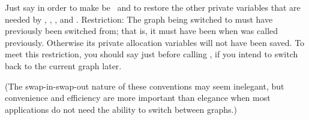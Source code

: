 Just say  in order to make 
be~ and
to restore the other private variables that are needed by
, , , and %
.
Restriction: The graph  being switched to must have previously been
switched from; that is, it must have been  when 
was called previously. Otherwise its private allocation variables will
not have been saved. To meet this restriction, you should say
 just before calling , if you
intend to switch back to the current graph later.

(The swap-in-swap-out nature of these conventions may seem inelegant, but
convenience and efficiency are more important than elegance when most
applications do not need the ability to switch between graphs.)

